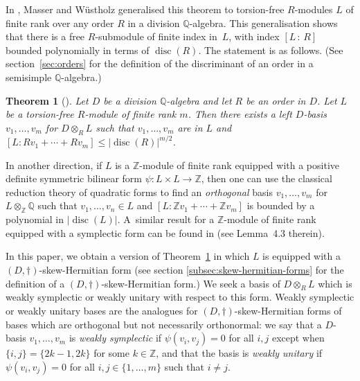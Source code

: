 \documentclass[JEP,XML,SOM,Unicode,NoFloatCountersInSection]{cedram}
\newcommand{\bQ}{\mathbb{Q}}
\newcommand{\bZ}{\mathbb{Z}}
\DeclareMathOperator{\disc}{disc}
\newcommand{\abs}[1]{\lvert #1 \rvert}
\newcommand{\defterm}[1]{\emph{#1}}
\newtheorem{theorem}[lemma]{Theorem}
\begin{document}
In \cite{MW95}, Masser and Wüstholz generalised this theorem to torsion-free $R$\nobreakdash-mod\-ules $L$ of finite rank over any order $R$ in a division $\bQ$-algebra.
This generalisation shows that there is a free $R$-submodule of finite index in~$L$, with index $[L\,{:}\,R]$ bounded polynomially in terms of $\disc(R)$.
The statement is as follows. (See section~\ref{sec:orders} for the definition of the discriminant of an order in a semisimple $\bQ$-algebra.)

\begin{theorem}[{\cite[Chap.\,2, Class Index Lem.]{MW95}}]\label{minkowski-general-index}
Let $D$ be a division $\bQ$-algebra and let $R$ be an order in $D$.
Let $L$ be a torsion-free $R$-module of finite rank $m$.
Then there exists a left $D$-basis $v_1, \dotsc, v_m$ for $D \otimes_R L$ such that $v_1, \dotsc, v_m$ are in $L$ and $[L:Rv_1 + \dotsb + Rv_m] \leq \abs{\disc(R)}^{m/2}$.
\end{theorem}

In another direction, if $L$ is a $\bZ$-module of finite rank equipped with a positive definite symmetric bilinear form $\psi \colon L \times L \to \bZ$, then one can use the classical reduction theory of quadratic forms to find an \textit{orthogonal} basis $v_1, \dotsc, v_m$ for $L \otimes_\bZ \bQ$ such that $v_1, \dotsc, v_n \in L$ and $[L:\bZ v_1 + \dotsb + \bZ v_m]$ is bounded by a polynomial in $\abs{\disc(L)}$.
A~similar result for a $\bZ$-module of finite rank equipped with a symplectic form can be found in \cite{Orr15} (see Lemma~4.3 therein).

In this paper, we obtain a version of Theorem~\ref{minkowski-general-index} in which $L$ is equipped with a $(D,\dag)$-skew-Hermitian form (see section \ref{subsec:skew-hermitian-forms} for the definition of a $(D,\dag)$-skew-Hermitian form.)
We seek a basis of $D \otimes_R L$ which is weakly symplectic or weakly unitary with respect to this form. Weakly symplectic or weakly unitary bases are the analogues for $(D,\dag)$-skew-Hermitian forms of bases which are orthogonal but not necessarily orthonormal: we say that a $D$-basis $v_1, \dotsc, v_m$ is \defterm{weakly symplectic} if $\psi(v_i, v_j) = 0$ for all $i, j$ except when $\{i,j\} = \{2k-1,2k\}$ for some $k \in \bZ$, and that the basis is \defterm{weakly unitary} if $\psi(v_i, v_j) = 0$ for all $i, j \in \{ 1, \dotsc, m \}$ such that $i \neq j$.
\end{document}
